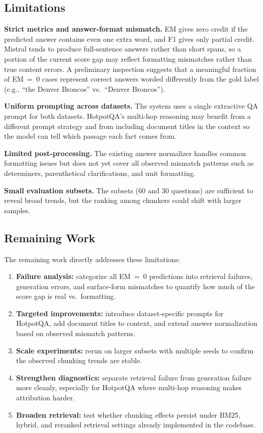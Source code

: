 \documentclass[11pt]{article}
\begin{document}
\subsection{Limitations}

\textbf{Strict metrics and answer-format mismatch.}  EM gives zero credit if the predicted answer contains even one extra word, and F1 gives only partial credit. Mistral tends to produce full-sentence answers rather than short spans, so a portion of the current score gap may reflect formatting mismatches rather than true content errors. A preliminary inspection suggests that a meaningful fraction of EM~=~0 cases represent correct answers worded differently from the gold label (e.g., ``the Denver Broncos'' vs.\ ``Denver Broncos'').

\textbf{Uniform prompting across datasets.}  The system uses a single extractive QA prompt for both datasets. HotpotQA's multi-hop reasoning may benefit from a different prompt strategy and from including document titles in the context so the model can tell which passage each fact comes from.

\textbf{Limited post-processing.}  The existing answer normalizer handles common formatting issues but does not yet cover all observed mismatch patterns such as determiners, parenthetical clarifications, and unit formatting.

\textbf{Small evaluation subsets.}  The subsets (60 and 30 questions) are sufficient to reveal broad trends, but the ranking among chunkers could shift with larger samples.

\subsection{Remaining Work}

The remaining work directly addresses these limitations:
\begin{enumerate}
  \item \textbf{Failure analysis:} categorize all EM~=~0 predictions into retrieval failures, generation errors, and surface-form mismatches to quantify how much of the score gap is real vs.\ formatting.
  \item \textbf{Targeted improvements:} introduce dataset-specific prompts for HotpotQA, add document titles to context, and extend answer normalization based on observed mismatch patterns.
  \item \textbf{Scale experiments:} rerun on larger subsets with multiple seeds to confirm the observed chunking trends are stable.
  \item \textbf{Strengthen diagnostics:} separate retrieval failure from generation failure more cleanly, especially for HotpotQA where multi-hop reasoning makes attribution harder.
  \item \textbf{Broaden retrieval:} test whether chunking effects persist under BM25, hybrid, and reranked retrieval settings already implemented in the codebase.
\end{enumerate}
\end{document}
